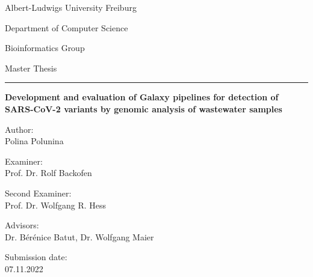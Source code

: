 %
\begin{titlepage}
 \centering
 Albert-Ludwigs University Freiburg
 
 Department of Computer Science
 
 Bioinformatics Group
 \vspace{4cm}
 
  Master Thesis
 \vspace{3mm} 
  
 \huge \hrule \vspace{5mm}
 \textbf{Development and evaluation of Galaxy pipelines for detection of SARS-CoV-2 variants by genomic analysis of wastewater samples}
 
 \hrulefill
 
 \vfill
 \raggedright
 \normalsize
  Author:\\
  Polina Polunina 
  
  Examiner:\\
  Prof. Dr. Rolf Backofen
  
  Second Examiner:\\
  Prof. Dr. Wolfgang R. Hess
  
  Advisors:\\
  Dr. Bérénice Batut, Dr. Wolfgang Maier
  
  Submission date:\\
  07.11.2022

\end{titlepage}
